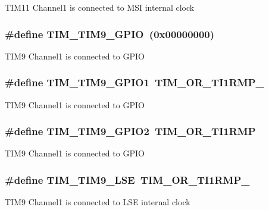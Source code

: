 T\-I\-M11 Channel1 is connected to M\-S\-I internal clock \hypertarget{group___t_i_m_ex___remap_ga05cfad41533bf2756c340605363ed19f}{
\subsubsection[{T\-I\-M\-\_\-\-T\-I\-M9\-\_\-\-G\-P\-I\-O}]{\setlength{\rightskip}{0pt plus 5cm}\#define T\-I\-M\-\_\-\-T\-I\-M9\-\_\-\-G\-P\-I\-O~(0x00000000)}}\label{group___t_i_m_ex___remap_ga05cfad41533bf2756c340605363ed19f}
T\-I\-M9 Channel1 is connected to G\-P\-I\-O \hypertarget{group___t_i_m_ex___remap_ga9be309e524529ea9f561bc86c98d057b}{
\subsubsection[{T\-I\-M\-\_\-\-T\-I\-M9\-\_\-\-G\-P\-I\-O1}]{\setlength{\rightskip}{0pt plus 5cm}\#define T\-I\-M\-\_\-\-T\-I\-M9\-\_\-\-G\-P\-I\-O1~{\bf T\-I\-M\-\_\-\-O\-R\-\_\-\-T\-I1\-R\-M\-P\-\_}}}\label{group___t_i_m_ex___remap_ga9be309e524529ea9f561bc86c98d057b}
T\-I\-M9 Channel1 is connected to G\-P\-I\-O \hypertarget{group___t_i_m_ex___remap_gaa032a75b028bb983d7a023c8b3565fd5}{
\subsubsection[{T\-I\-M\-\_\-\-T\-I\-M9\-\_\-\-G\-P\-I\-O2}]{\setlength{\rightskip}{0pt plus 5cm}\#define T\-I\-M\-\_\-\-T\-I\-M9\-\_\-\-G\-P\-I\-O2~{\bf T\-I\-M\-\_\-\-O\-R\-\_\-\-T\-I1\-R\-M\-P}}}\label{group___t_i_m_ex___remap_gaa032a75b028bb983d7a023c8b3565fd5}
T\-I\-M9 Channel1 is connected to G\-P\-I\-O \hypertarget{group___t_i_m_ex___remap_gac823cb02bf4f849764a4560358663908}{
\subsubsection[{T\-I\-M\-\_\-\-T\-I\-M9\-\_\-\-L\-S\-E}]{\setlength{\rightskip}{0pt plus 5cm}\#define T\-I\-M\-\_\-\-T\-I\-M9\-\_\-\-L\-S\-E~{\bf T\-I\-M\-\_\-\-O\-R\-\_\-\-T\-I1\-R\-M\-P\-\_}}}\label{group___t_i_m_ex___remap_gac823cb02bf4f849764a4560358663908}
T\-I\-M9 Channel1 is connected to L\-S\-E internal clock 